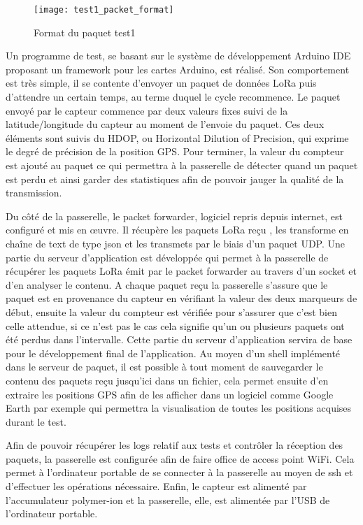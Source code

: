 \begin{figure}[htb]
\centering 
\texttt{[image: test1\_packet\_format]} 
\caption{Format du paquet test1}
\label{fig:test1_paquet}
\end{figure}

Un programme de test, se basant sur le système de développement Arduino IDE proposant un framework pour les cartes Arduino, est réalisé. Son comportement est très simple, il se contente d'envoyer un paquet de données LoRa puis d'attendre un certain temps, au terme duquel le cycle recommence. Le paquet envoyé par le capteur commence par deux valeurs fixes suivi de la latitude/longitude du capteur au moment de l'envoie du paquet. Ces deux éléments sont suivis du HDOP, ou Horizontal Dilution of Precision, qui exprime le degré de précision de la position GPS. Pour terminer, la valeur du compteur est ajouté au paquet ce qui permettra à la passerelle de détecter quand un paquet est perdu et ainsi garder des statistiques afin de pouvoir jauger la qualité de la transmission.

Du côté de la passerelle, le packet forwarder, logiciel repris depuis internet, est configuré et mis en œuvre. Il récupère les paquets LoRa reçu , les transforme en chaîne de text de type json et les transmets par le biais d'un paquet UDP. Une partie du serveur d'application est développée qui permet à la passerelle de récupérer les paquets LoRa émit par le packet forwarder au travers d'un socket et d'en analyser le contenu. A chaque paquet reçu la passerelle s'assure que le paquet est en provenance du capteur en vérifiant la valeur des deux marqueurs de début, ensuite la valeur du compteur est vérifiée pour s'assurer que c'est bien celle attendue, si ce n'est pas le cas cela signifie qu'un ou plusieurs paquets ont été perdus dans l'intervalle. Cette partie du serveur d'application servira de base pour le développement final de l'application. 
Au moyen d'un shell implémenté dans le serveur de paquet, il est possible à tout moment de sauvegarder le contenu des paquets reçu jusqu'ici dans un fichier, cela permet ensuite d'en extraire les positions GPS afin de les afficher dans un logiciel comme Google Earth par exemple qui permettra la visualisation de toutes les positions acquises durant le test.

Afin de pouvoir récupérer les logs relatif aux tests et contrôler la réception des paquets, la passerelle est configurée afin de faire office de access point WiFi. Cela permet à l'ordinateur portable de se connecter à la passerelle au moyen de ssh et d'effectuer les opérations nécessaire.
Enfin, le capteur est alimenté par l'accumulateur polymer-ion et la passerelle, elle, est alimentée par l'USB de l'ordinateur portable.

